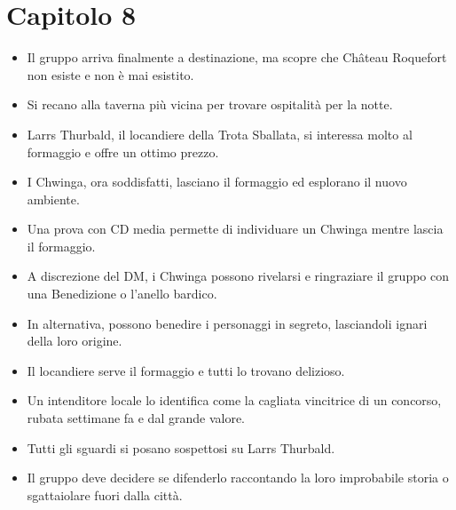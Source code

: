 \documentclass{article}
\begin{document}
\section{Capitolo 8}
\begin{itemize}
    \item Il gruppo arriva finalmente a destinazione, ma scopre che Château Roquefort non esiste e non è mai esistito.
    \item Si recano alla taverna più vicina per trovare ospitalità per la notte.
    \item Larrs Thurbald, il locandiere della Trota Sballata, si interessa molto al formaggio e offre un ottimo prezzo.
    \item I Chwinga, ora soddisfatti, lasciano il formaggio ed esplorano il nuovo ambiente.
    \item Una prova con CD media permette di individuare un Chwinga mentre lascia il formaggio.
    \item A discrezione del DM, i Chwinga possono rivelarsi e ringraziare il gruppo con una Benedizione o l'anello bardico.
    \item In alternativa, possono benedire i personaggi in segreto, lasciandoli ignari della loro origine.
    \item Il locandiere serve il formaggio e tutti lo trovano delizioso.
    \item Un intenditore locale lo identifica come la cagliata vincitrice di un concorso, rubata settimane fa e dal grande valore.
    \item Tutti gli sguardi si posano sospettosi su Larrs Thurbald.
    \item Il gruppo deve decidere se difenderlo raccontando la loro improbabile storia o sgattaiolare fuori dalla città.
\end{itemize}
\end{document}
